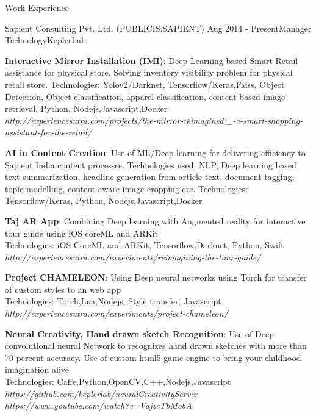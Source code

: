 \documentclass{resume} %
\begin{document}
\begin{rSection}{Work Experience}
\begin{rSubsection}{Sapient Consulting Pvt. Ltd. (PUBLICIS.SAPIENT) }{Aug 2014 - Present}{Manager Technology}{KeplerLab}
\item \textbf{Interactive Mirror Installation (IMI)}:
Deep Learning based Smart Retail assistance for physical store. 
Solving inventory visibility problem for physical retail store.
Technologies: Yolov2/Darknet, Tensorflow/Keras,Faiss,
Object Detection, Object classification, apparel classification, 
content based image retrieval, Python, Nodejs,Javascript,Docker  \\
\textit{http://experiencesutra.com/projects/the-mirror-reimagined\char`_-a-smart-shopping-assistant-for-the-retail/}

\item \textbf{AI in Content Creation}:
Use of ML/Deep learning for delivering efficiency to Sapient India content processes.
Technologies used: NLP, Deep learning based text summarization,
headline generation from article text, document tagging, topic modelling,
content aware image cropping etc.
Technologies: Tensorflow/Keras, Python, Nodejs,Javascript,Docker 

\item \textbf{Taj AR App}:
Combining Deep learning with Augmented reality for interactive tour guide using iOS coreML and ARKit \\ 
Technologies: iOS CoreML and ARKit, Tensorflow,Darknet, Python, Swift \\
\textit{http://experiencesutra.com/experiments/reimagining-the-tour-guide/}


\item \textbf{Project CHAMELEON}:
Using Deep neural networks using Torch for transfer of custom styles to an web app\\ 
Technologies: Torch,Lua,Nodejs, Style transfer, Javascript\\
\textit{http://experiencesutra.com/experiments/project-chameleon/}

\item \textbf{Neural Creativity, Hand drawn sketch Recognition}:
Use of Deep convolutional neural Network to recognizes hand drawn sketches
with more than 70 percent accuracy. Use of custom html5 game engine to bring
your childhood imagination alive\\ 
Technologies: Caffe,Python,OpenCV,C++,Nodejs,Javascript\\
\textit{https://github.com/keplerlab/neuralCreativityServer} \\
\textit{https://www.youtube.com/watch?v=VajzcTbMobA}


\end{rSubsection}
\end{rSection}
\end{document}
